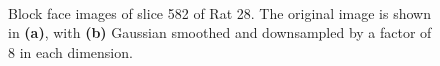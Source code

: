 		\begin{figure}[htbp]
		  \centering
		  \
		  \caption{Block face images of slice 582 of Rat 28. The original image is shown in \textbf{(a)}, with \textbf{(b)} Gaussian smoothed and downsampled by a factor of 8 in each dimension.}
		  \label{fig:original_lores_images}
		\end{figure}
    
